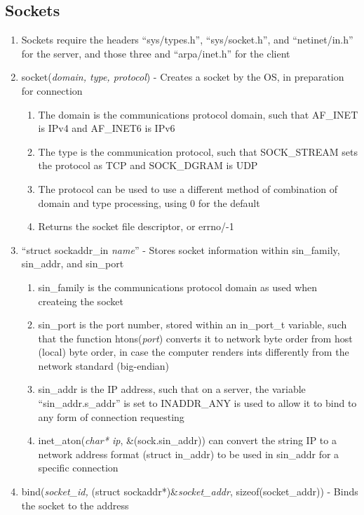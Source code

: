 \documentclass[11 pt, twoside]{article}
\begin{document}
\subsection{Sockets}
\begin{enumerate}
\item Sockets require the headers ``sys/types.h'', ``sys/socket.h'', and ``netinet/in.h'' for the server, and those three and ``arpa/inet.h'' for the client
\item socket(\textit{domain, type, protocol}) - Creates a socket by the OS, in preparation for connection
\begin{enumerate}
\item The domain is the communications protocol domain, such that AF\_INET is IPv4 and AF\_INET6 is IPv6
\item The type is the communication protocol, such that SOCK\_STREAM sets the protocol as TCP and SOCK\_DGRAM is UDP
\item The protocol can be used to use a different method of combination of domain and type processing, using 0 for the default
\item Returns the socket file descriptor, or errno/-1
\end{enumerate}
\item ``struct sockaddr\_in \textit{name}'' - Stores socket information within sin\_family, sin\_addr, and sin\_port
\begin{enumerate}
\item sin\_family is the communications protocol domain as used when createing the socket
\item sin\_port is the port number, stored within an in\_port\_t variable, such that the function htons(\textit{port}) converts it to network byte order from host (local) byte order, in case the computer renders ints differently from the network standard (big-endian)
\item sin\_addr is the IP address, such that on a server, the variable ``sin\_addr.s\_addr'' is set to INADDR\_ANY is used to allow it to bind to any form of connection requesting\item inet\_aton(\textit{char* ip}, \&(sock.sin\_addr)) can convert the string IP to a network address format (struct in\_addr) to be used in sin\_addr for a specific connection
\end{enumerate}
\item bind(\textit{socket\_id,} (struct sockaddr*)\&\textit{socket\_addr}, {sizeof(socket\_addr)}) - Binds the socket to the address
\begin{enumerate}

\end{enumerate}
\end{enumerate}
\end{document}
